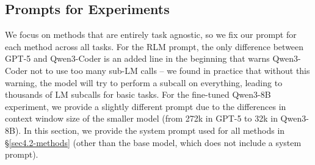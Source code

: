 \subsection{Prompts for Experiments}
We focus on methods that are entirely task agnostic, so we fix our prompt for each method across all tasks. For the RLM prompt, the only difference between GPT-5 and Qwen3-Coder is an added line in the beginning that warns Qwen3-Coder not to use too many sub-LM calls -- we found in practice that without this warning, the model will try to perform a subcall on everything, leading to thousands of LM subcalls for basic tasks. For the fine-tuned Qwen3-8B experiment, we provide a slightly different prompt due to the differences in context window size of the smaller model (from 272k in GPT-5 to 32k in Qwen3-8B). In this section, we provide the system prompt used for all methods in \S\ref{sec4.2-methods} (other than the base model, which does not include a system prompt).


